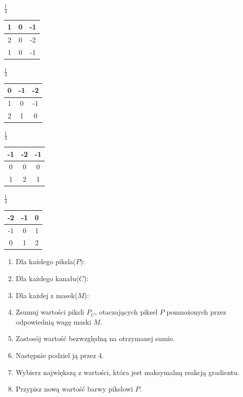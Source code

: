 \documentclass[final,a4paper,openany,12pt]{mwbk}
\begin{document}
\begin{center}
	$\frac{1}{4}$
	\begin{tabular}{|c|c|c|}
		\hline
		1 & 0 & -1\\
		\hline
		2 & 0 & -2\\
		\hline
		1 & 0 & -1\\
		\hline
	\end{tabular}
\end{center}

\begin{center}
	$\frac{1}{4}$
	\begin{tabular}{|c|c|c|}
		\hline
		0 & -1 & -2\\
		\hline
		1 & 0 & -1\\
		\hline
		2 & 1 & 0\\
		\hline
	\end{tabular}
\end{center}

\begin{center}
	$\frac{1}{4}$
	\begin{tabular}{|c|c|c|}
		\hline
		-1 & -2 & -1\\
		\hline
		0 & 0 & 0\\
		\hline
		1 & 2 & 1\\
		\hline
	\end{tabular}
\end{center}

\begin{center}
	$\frac{1}{4}$
	\begin{tabular}{|c|c|c|}
		\hline
		-2 & -1 & 0\\
		\hline
		-1 & 0 & 1\\
		\hline
		0 & 1 & 2\\
		\hline
	\end{tabular}
\end{center}

\begin{enumerate}
	\item Dla każdego piksla($P$):
	\item Dla każdego kanału($C$):
	\item Dla każdej z masek($M$):
	\item Zsumuj wartości piksli $P_C$, otaczających piksel $P$ pomnożonych przez odpowiednią wagę maski $M$.
	\item Zastosój wartość bezwzględną na otrzymanej sumie.
	\item Następnie podziel ją przez 4.
	\item Wybierz największą z wartości, która jest maksymalną reakcją gradientu.
	\item Przypisz nową wartość barwy pikslowi $P$.
\end{enumerate}
\end{document}

